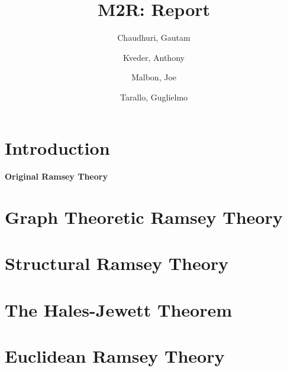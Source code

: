 \documentclass{article}
\title{M2R: Report}
\author{
  Chaudhuri, Gautam\\
  \ttfamily{CID:01344735}\and
  Kveder, Anthony\\
  \ttfamily{CID:01234567}\and
  Malbon, Joe\\
  \ttfamily{CID:01234567}\and
  Tarallo, Guglielmo\\
  \ttfamily{CID:01234567}
}
\begin{document}
\maketitle
\tableofcontents

\section*{Introduction}
\label{sec:0}

\paragraph{Original Ramsey Theory}

\newpage
\section{Graph Theoretic Ramsey Theory}
\label{sec:1}

\newpage
\section{Structural Ramsey Theory}
\label{sec:2}


\newpage
\section{The Hales-Jewett Theorem}
\label{sec:3}

\newpage
\section{Euclidean Ramsey Theory}
\label{sec:4}


\printbibliography
\end{document}
